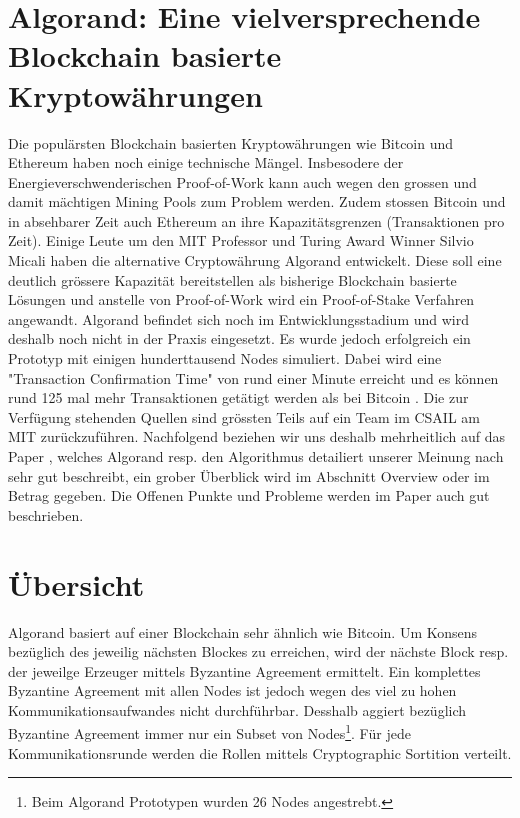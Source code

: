 \documentclass[11pt,a4paper]{article}
\author{Heinz Hofmann und Jonas Schmid}
\begin{document}
\section*{ \center \textbf{\LARGE Algorand: Eine vielversprechende Blockchain basierte Kryptow\"ahrungen}}

Die populärsten Blockchain basierten Kryptow\"ahrungen wie Bitcoin und Ethereum haben noch einige technische M\"angel.
Insbesodere der Energieverschwenderischen Proof-of-Work kann auch wegen den grossen 
und damit m\"achtigen Mining Pools zum Problem werden.
Zudem stossen Bitcoin und in absehbarer Zeit auch Ethereum an ihre Kapazit\"atsgrenzen (Transaktionen pro Zeit).
Einige Leute um den MIT Professor und Turing Award Winner Silvio Micali haben die alternative Cryptow\"ahrung Algorand entwickelt.
Diese soll eine deutlich gr\"ossere Kapazit\"at bereitstellen als bisherige Blockchain basierte L\"osungen und anstelle von Proof-of-Work wird ein Proof-of-Stake Verfahren angewandt.
Algorand befindet sich noch im Entwicklungsstadium und wird deshalb noch nicht in der Praxis eingesetzt.
Es wurde jedoch erfolgreich ein Prototyp mit einigen hunderttausend Nodes simuliert\cite[Kapitel Implementation \& Evaluation]{Gilad:2017:ASB:3132747.3132757}.
Dabei wird eine "Transaction Confirmation Time" von rund einer Minute erreicht und es k\"onnen rund 125 mal mehr Transaktionen get\"atigt werden als bei Bitcoin \cite[Introduction]{Gilad:2017:ASB:3132747.3132757}.
Die zur Verf\"ugung stehenden Quellen sind gr\"ossten Teils auf ein Team im CSAIL am MIT zur\"uckzuf\"uhren. %
Nachfolgend beziehen wir uns deshalb mehrheitlich auf das Paper \cite{Gilad:2017:ASB:3132747.3132757}, 
welches Algorand resp. den Algorithmus detailiert unserer Meinung nach sehr gut beschreibt,
ein grober \"Uberblick wird im Abschnitt Overview oder im Betrag \cite{ScalingConsensus} gegeben.
Die Offenen Punkte und Probleme werden im Paper auch gut beschrieben.

\section*{\"Ubersicht}
Algorand basiert auf einer Blockchain sehr \"ahnlich wie Bitcoin.
Um Konsens bez\"uglich des jeweilig n\"achsten Blockes zu erreichen,
wird der n\"achste Block resp. der jeweilge Erzeuger mittels Byzantine Agreement ermittelt.
Ein komplettes Byzantine Agreement mit allen Nodes ist jedoch wegen des viel zu hohen Kommunikationsaufwandes nicht durchf\"uhrbar.
Desshalb aggiert bez\"uglich Byzantine Agreement immer nur ein Subset von Nodes\footnote{Beim Algorand Prototypen wurden 26 Nodes angestrebt.}.
F\"ur jede Kommunikationsrunde werden die Rollen mittels Cryptographic Sortition verteilt.
\end{document}
